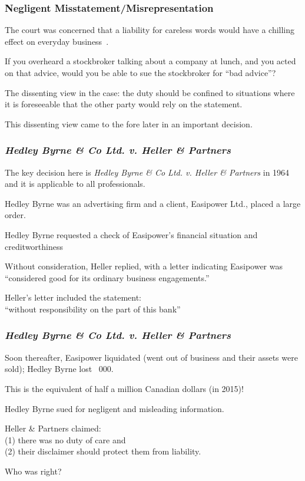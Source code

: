 \begin{frame}
\frametitle{Negligent Misstatement/Misrepresentation}

The court was concerned that a liability for careless words would have a chilling effect on everyday business~\cite{lba}.

If you overheard a stockbroker talking about a company at lunch, and you acted on that advice, would you be able to sue the stockbroker for ``bad advice''?

The dissenting view in the case: the duty should be confined to situations where it is foreseeable that the other party would rely on the statement.

This dissenting view came to the fore later in an important decision.

\end{frame}


\begin{frame}
\frametitle{\textit{Hedley Byrne \& Co Ltd. v. Heller \& Partners}}

The key decision here is \textit{Hedley Byrne \& Co Ltd. v. Heller \& Partners} in 1964 and it is applicable to all professionals.

Hedley Byrne was an advertising firm and a client, Easipower Ltd., placed a large order.

Hedley Byrne requested a check of Easipower's financial situation and creditworthiness

Without consideration, Heller replied, with a letter indicating Easipower was\\
\quad``considered good for its ordinary business engagements.''

Heller's letter included the statement:\\
\quad ``without responsibility on the part of this bank''

\end{frame}



\begin{frame}
\frametitle{\textit{Hedley Byrne \& Co Ltd. v. Heller \& Partners}}

Soon thereafter, Easipower liquidated (went out of business and their assets were sold); Hedley Byrne lost ~000.

This is the equivalent of half a million Canadian dollars (in 2015)!

Hedley Byrne sued for negligent and misleading information.

Heller \& Partners claimed: \\
\quad (1) there was no duty of care and\\
\quad (2) their disclaimer should protect them from liability.

Who was right?

\end{frame}



